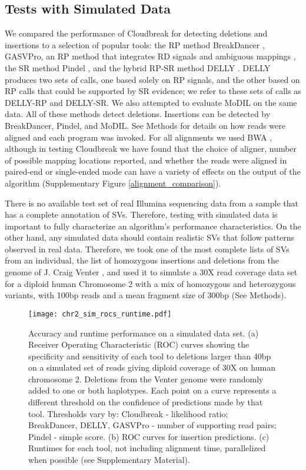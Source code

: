\documentclass[11pt]{article}
\begin{document}
\subsection{Tests with Simulated Data}

We compared the performance of Cloudbreak for detecting deletions and insertions to a selection of popular tools: the RP method BreakDancer \autocite{Chen:2009p3}, GASVPro, an RP method that integrates RD signals and ambiguous mappings \autocite{Sindi:2012kk}, the SR method Pindel \autocite{Ye:2009p2}, and the hybrid RP-SR method DELLY \autocite{Rausch:2012he}. DELLY produces two sets of calls, one based solely on RP signals, and the other based on RP calls that could be supported by SR evidence; we refer to these sets of calls as DELLY-RP and DELLY-SR. We also attempted to evaluate MoDIL on the same data. All of these methods detect deletions. Insertions can be detected by BreakDancer, Pindel, and MoDIL. See Methods for details on how reads were aligned and each program was invoked. For all alignments we used BWA \autocite{Li:2009p836}, although in testing Cloudbreak we have found that the choice of aligner, number of possible mapping locations reported, and whether the reads were aligned in paired-end or single-ended mode can have a variety of effects on the output of the algorithm (Supplementary Figure \ref{alignment_comparison}).

There is no available test set of real Illumina sequencing data from a sample that has a complete annotation of SVs. Therefore, testing with simulated data is important to fully characterize an algorithm's performance characteristics. On the other hand, any simulated data should contain realistic SVs that follow patterns observed in real data. Therefore, we took one of the most complete lists of SVs from an individual, the list of homozygous insertions and deletions from the genome of J. Craig Venter \autocite{Levy:2007fb}, and used it to simulate a 30X read coverage data set for a diploid human Chromosome 2 with a mix of homozygous and heterozygous variants, with 100bp reads and a mean fragment size of 300bp (See Methods).

\begin{figure}
\centering
\texttt{[image: chr2\_sim\_rocs\_runtime.pdf]}
\caption{Accuracy and runtime performance on a simulated data set. (a) Receiver Operating Characteristic (ROC) curves showing the specificity and sensitivity of each tool to deletions larger than 40bp on a simulated set of reads giving diploid coverage of 30X on human chromosome 2. Deletions from the Venter genome were randomly added to one or both haplotypes. Each point on a curve represents a different threshold on the confidence of predictions made by that tool. Thresholds vary by: Cloudbreak - likelihood ratio; BreakDancer, DELLY, GASVPro - number of supporting read pairs; Pindel - simple score. (b) ROC curves for insertion predictions. (c) Runtimes for each tool, not including alignment time, parallelized when possible (see Supplementary Material).}
\label{chr2CombinedRoc}
\end{figure}
\end{document}
